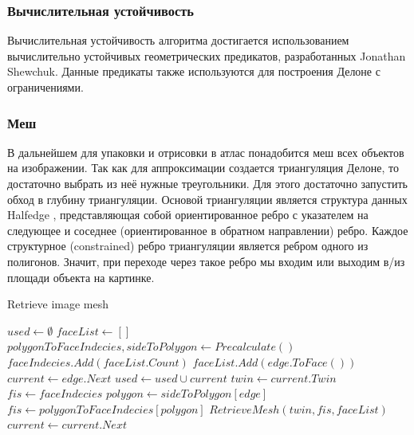 \documentclass{fefu_thesis/cls/fefu}
\newenvironment{algo}[1][]
  {\begin{algorithm}[#1]
     \selectlanguage{english}
     \floatname{algorithm}{Алгоритм}
  }
  {\end{algorithm}}
\begin{document}
    \subsubsection{Вычислительная устойчивость}
    Вычислительная устойчивость алгоритма достигается использованием вычислительно устойчивых геометрических предикатов, разработанных Jonathan Shewchuk\cite{shewchuk97a}. Данные предикаты также используются для построения Делоне с ограничениями.
    \subsubsection{Меш}
    В дальнейшем для упаковки и отрисовки в атлас понадобится меш всех объектов на изображении. Так как для аппроксимации создается триангуляция Делоне, то достаточно выбрать из неё нужные треугольники. Для этого достаточно запустить обход в глубину триангуляции. Основой триангуляции является структура данных Halfedge \cite{Halfedge}, представляющая собой ориентированное ребро с указателем на следующее и соседнее (ориентированное в обратном направлении) ребро. Каждое структурное (constrained) ребро триангуляции является ребром одного из полигонов. Значит, при переходе через такое ребро мы входим или выходим в/из площади объекта на картинке.

    \begin{algo}[H]
        \caption{Retrieve image mesh}
        \begin{algorithmic}[1]
            \State $used \gets \emptyset$
            \State $faceList \gets []$
            \State $polygonToFaceIndecies, sideToPolygon \gets Precalculate()$
                 
                    \State $faceIndecies.Add(faceList.Count)$
                    \State $faceList.Add(edge.ToFace())$
                    \State $current \gets edge.Next$
                            \State $used \gets used \cup current$
                            \State $twin \gets current.Twin$
                            \State $fis \gets faceIndecies$
                                \State $polygon \gets sideToPolygon[edge]$ 
                                \State $fis \gets polygonToFaceIndecies[polygon]$
                            \EndIf
                            \State $RetrieveMesh(twin, fis, faceList)$
                        \EndIf
                    \EndWhile
                \EndIf
                \State $current \gets current.Next$
            \EndProcedure
        \end{algorithmic}
    \end{algo}
\end{document}
